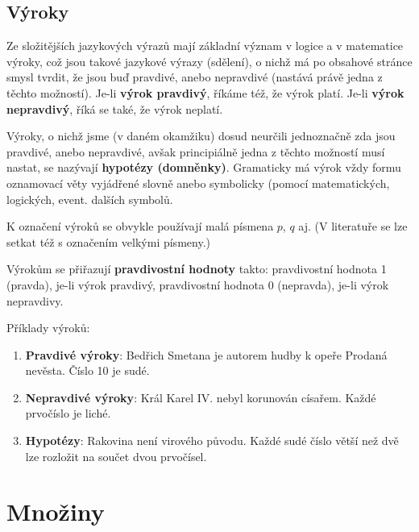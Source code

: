     \subsection{Výroky}
      Ze složitějších jazykových výrazů mají základní význam v logice a v matematice výroky, což 
      jsou takové jazykové výrazy (sdělení), o nichž má po obsahové stránce smysl tvrdit, že jsou 
      buď pravdivé, anebo nepravdivé (nastává právě jedna z těchto možností). Je-li \textbf{výrok 
      pravdivý}, říkáme též, že výrok platí. Je-li \textbf{výrok nepravdivý}, říká se také, že 
      výrok neplatí.
      
      Výroky, o nichž jsme (v daném okamžiku) dosud neurčili jednoznačně zda jsou pravdivé, anebo 
      nepravdivé, avšak principiálně jedna z těchto možností musí nastat, se nazývají 
      \textbf{hypotézy (domněnky)}. Gramaticky má výrok vždy formu oznamovací věty vyjádřené slovně 
      anebo symbolicky (pomocí matematických, logických, event. dalších symbolů.
      
      K označení výroků se obvykle používají malá písmena \(p\), \(q\) aj. (V literatuře se lze 
      setkat též s označením velkými písmeny.) 
      
      Výrokům se přiřazují \textbf{pravdivostní hodnoty} takto: pravdivostní hodnota \num{1} 
      (pravda), je-li výrok  pravdivý, pravdivostní hodnota \num{0} (nepravda), je-li výrok 
      nepravdivy.
      
      Příklady výroků:
      \begin{enumerate}[label=\alph*)]
        \item \textbf{Pravdivé výroky}: Bedřich Smetana je autorem hudby k opeře Prodaná 
              nevěsta. Číslo \num{10} je sudé. 
        \item \textbf{Nepravdivé výroky}: Král Karel IV. nebyl korunován císařem. Každé prvočíslo 
              je liché. 
        \item \textbf{Hypotézy}: Rakovina není virového původu. Každé sudé číslo větší než dvě lze 
              rozložit na součet dvou prvočísel.
      \end{enumerate}
      
      
  \section{Množiny}\label{mai:IchapIsecII}

\printbibliography[heading=subbibliography]
